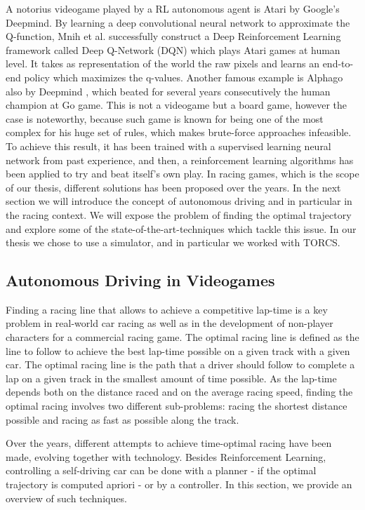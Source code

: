 A notorius videogame played by a RL autonomous agent is Atari \cite{atari} by Google's Deepmind. By learning a deep convolutional neural network to approximate the Q-function, Mnih et al. successfully construct a Deep Reinforcement Learning framework called Deep Q-Network (DQN) which plays Atari games at human level. It takes as representation of the world the raw pixels and learns an end-to-end policy which maximizes the q-values.
Another famous example is Alphago also by Deepmind \cite{alphago}, which beated for several years consecutively the human champion at Go game. This is not a videogame but a board game, however the case is noteworthy, because such game is known for being one of the most complex  for his huge set of rules, which makes brute-force approaches infeasible. To achieve this result, it has been trained with a supervised learning neural network from past experience, and then, a reinforcement learning algorithms has been applied to try and beat itself's own play. 
In racing games, which is the scope of our thesis, different solutions has been proposed over the years. In the next section we will introduce the concept of autonomous driving and in particular in the racing context. We will expose the problem of finding the optimal trajectory and explore some of the state-of-the-art-techniques which tackle this issue.
In our thesis we chose to use a simulator, and in particular we worked with TORCS.

\subsection{Autonomous Driving in Videogames}
Finding a racing line that allows to achieve a competitive lap-time is a key problem in real-world car racing as well as in the development of non-player characters for a commercial racing game.
The optimal racing line is defined as the line to follow to achieve the best lap-time possible on a given track with a given car. The optimal racing line is the path that a driver should follow to complete a lap on a given track in the smallest amount of time possible. As the lap-time depends both on the distance raced and on the average racing speed, finding the optimal racing involves two different sub-problems: racing the shortest distance possible and racing as fast as possible along the track.

Over the years, different attempts to achieve time-optimal racing have been made, evolving together with technology. Besides Reinforcement Learning, controlling a self-driving car can be done with a planner - if the optimal trajectory is computed apriori - or by a controller. In this section, we provide an overview of such techniques. 


